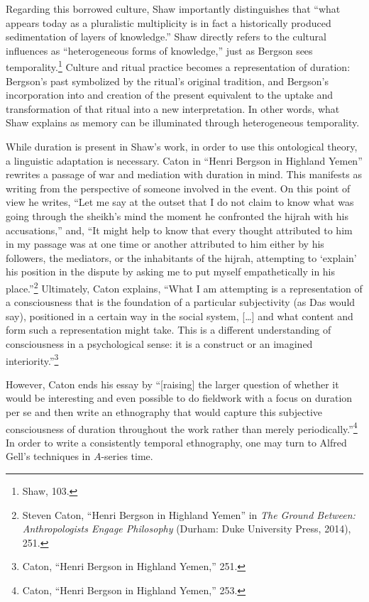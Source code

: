 Regarding this borrowed culture, Shaw importantly distinguishes that
``what appears today as a pluralistic multiplicity is in fact a
historically produced sedimentation of layers of knowledge.'' Shaw
directly refers to the cultural influences as ``heterogeneous forms of
knowledge,'' just as Bergson sees temporality.\footnote{Shaw, 103.}
Culture and ritual practice becomes a representation of duration:
Bergson's past symbolized by the ritual's original tradition, and
Bergson's incorporation into and creation of the present equivalent to
the uptake and transformation of that ritual into a new interpretation.
In other words, what Shaw explains as memory can be illuminated through
heterogeneous temporality.

While duration is present in Shaw's work, in order to use this
ontological theory, a linguistic adaptation is necessary. Caton in
``Henri Bergson in Highland Yemen'' rewrites a passage of war and
mediation with duration in mind. This manifests as writing from the
perspective of someone involved in the event. On this point of view he
writes, ``Let me say at the outset that I do not claim to know what was
going through the sheikh's mind the moment he confronted the hijrah with
his accusations,'' and, ``It might help to know that every thought
attributed to him in my passage was at one time or another attributed to
him either by his followers, the mediators, or the inhabitants of the
hijrah, attempting to `explain' his position in the dispute by asking me
to put myself empathetically in his place.''\footnote{Steven Caton,
  ``Henri Bergson in Highland Yemen'' in \emph{The Ground Between:
  Anthropologists Engage Philosophy} (Durham: Duke University Press,
  2014), 251.} Ultimately, Caton explains, ``What I am attempting is a
representation of a consciousness that is the foundation of a particular
subjectivity (as Das would say), positioned in a certain way in the
social system, {[}\ldots{]} and what content and form such a
representation might take. This is a different understanding of
consciousness in a psychological sense: it is a construct or an imagined
interiority.''\footnote{Caton, ``Henri Bergson in Highland Yemen,'' 251.}

However, Caton ends his essay by ``{[}raising{]} the larger question of
whether it would be interesting and even possible to do fieldwork with a
focus on duration per se and then write an ethnography that would
capture this subjective consciousness of duration throughout the work
rather than merely periodically.''\footnote{Caton, ``Henri Bergson in
  Highland Yemen,'' 253.} In order to write a consistently temporal
ethnography, one may turn to Alfred Gell's techniques in $A$-series time.

